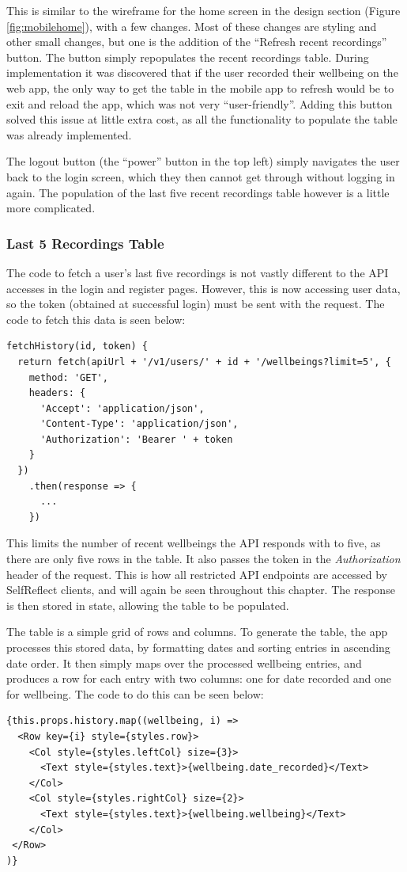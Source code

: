 \documentclass[11pt,openright,a4paper]{report}
\begin{document}
This is similar to the wireframe for the home screen in the design section (Figure \ref{fig:mobilehome}), with a few changes. Most of these changes are styling and other small changes, but one is the addition of the \enquote{Refresh recent recordings} button. The button simply repopulates the recent recordings table. During implementation it was discovered that if the user recorded their wellbeing on the web app, the only way to get the table in the mobile app to refresh would be to exit and reload the app, which was not very \enquote{user-friendly}. Adding this button solved this issue at little extra cost, as all the functionality to populate the table was already implemented.

The logout button (the \enquote{power} button in the top left) simply navigates the user back to the login screen, which they then cannot get through without logging in again. The population of the last five recent recordings table however is a little more complicated.

\subsubsection{Last 5 Recordings Table}
The code to fetch a user's last five recordings is not vastly different to the API accesses in the login and register pages. However, this is now accessing user data, so the token (obtained at successful login) must be sent with the request. The code to fetch this data is seen below:

\begin{lstlisting}
fetchHistory(id, token) {
  return fetch(apiUrl + '/v1/users/' + id + '/wellbeings?limit=5', {
    method: 'GET',
    headers: {
      'Accept': 'application/json',
      'Content-Type': 'application/json',
      'Authorization': 'Bearer ' + token
    }
  })
    .then(response => {
      ...
    })
\end{lstlisting}

This limits the number of recent wellbeings the API responds with to five, as there are only five rows in the table. It also passes the token in the \emph{Authorization} header of the request. This is how all restricted API endpoints are accessed by SelfReflect clients, and will again be seen throughout this chapter. The response is then stored in state, allowing the table to be populated.

The table is a simple grid of rows and columns. To generate the table, the app processes this stored data, by formatting dates and sorting entries in ascending date order. It then simply maps over the processed wellbeing entries, and produces a row for each entry with two columns: one for date recorded and one for wellbeing. The code to do this can be seen below:
\begin{lstlisting}
{this.props.history.map((wellbeing, i) =>
  <Row key={i} style={styles.row}>
    <Col style={styles.leftCol} size={3}>
      <Text style={styles.text}>{wellbeing.date_recorded}</Text>
    </Col>
    <Col style={styles.rightCol} size={2}>
      <Text style={styles.text}>{wellbeing.wellbeing}</Text>
    </Col>
 </Row>
)}
\end{lstlisting}
\end{document}
